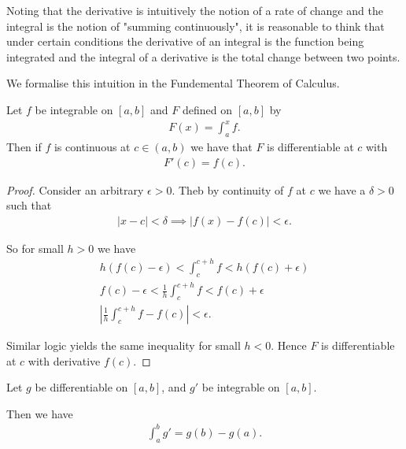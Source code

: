 \documentclass[]{article}
\begin{document}
Noting that the derivative is intuitively the notion of a rate of change and the integral is the notion of "summing continuously", it is reasonable to think that under certain conditions the derivative of an integral is the function being integrated and the integral of a derivative is the total change between two points.

We formalise this intuition in the Fundemental Theorem of Calculus.

\begin{thm} 
		Let $f$ be integrable on $[a,b]$ and $F$ defined on $[a,b]$ by
		\begin{align*}
				F(x) = \int_a^xf.
		\end{align*}
		Then if $f$ is continuous at $c \in (a,b)$ we have that $F$ is differentiable at $c$ with
		\begin{align*}
				F'(c) = f(c).
		\end{align*}
\end{thm} 

\begin{proof}
		Consider an arbitrary $\epsilon > 0$. Theb by continuity of $f$ at $c$ we have a $\delta > 0$ such that
		\begin{align*}
				|x - c| < \delta \implies |f(x) - f(c)| < \epsilon.
		\end{align*}

		So for small $h > 0$ we have 
		\begin{align*}
				h(f(c) - \epsilon) < \int_c^{c+h}f < h(f(c) + \epsilon) \\
				f(c) - \epsilon < \frac{1}{h}\int_c^{c+h}f < f(c) + \epsilon \\
				\left|\frac{1}{h}\int_c^{c+h}f - f(c)\right| < \epsilon.
		\end{align*}

		Similar logic yields the same inequality for small $h<0$. Hence $F$ is differentiable at $c$ with derivative $f(c)$.
\end{proof}

\begin{thm} 
		Let $g$ be differentiable on $[a,b]$, and $g'$ be integrable on $[a,b]$.

		Then we have
		\begin{align*}
				\int_a^b g' = g(b) - g(a).
		\end{align*}
\end{thm}
\end{document}
